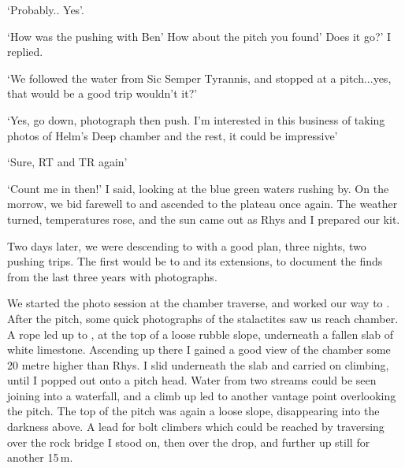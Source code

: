     `Probably.. Yes'.

    `How was the pushing with Ben' How about the pitch you found' Does it go?' I replied.

    `We followed the water from Sic Semper Tyrannis, and stopped at a pitch...yes, that would be a good trip wouldn't it?'

    `Yes, go down, photograph then push. I'm interested in this business of taking photos of Helm's Deep chamber and the rest, it could be impressive'

    `Sure, RT and TR again'

    `Count me in then!' I said, looking at the blue green waters rushing by. On the morrow, we bid farewell to  and ascended to the plateau once again. The weather turned, temperatures rose, and the sun came out as Rhys and I prepared our kit.
    
    \mydelimiter

    Two days later, we were descending to  with a good plan, three nights, two pushing trips. The first would be to  and its extensions, to document the finds from the last three years with photographs.

    We started the photo session at the  chamber traverse, and worked our way to . After the pitch, some quick photographs of the  stalactites saw us reach  chamber. A rope led up to , at the top of a loose rubble slope, underneath a fallen slab of white limestone. Ascending up there I gained a good view of the chamber some 20 metre higher than Rhys. I slid underneath the slab and carried on climbing, until I popped out onto a pitch head. Water from two streams could be seen joining into a waterfall, and a climb up led to another vantage point overlooking the pitch. The top of the pitch was again a loose slope, disappearing into the darkness above. A lead for bolt climbers which could be reached by traversing over the rock bridge I stood on, then over the drop, and further up still for another 15\,m.

